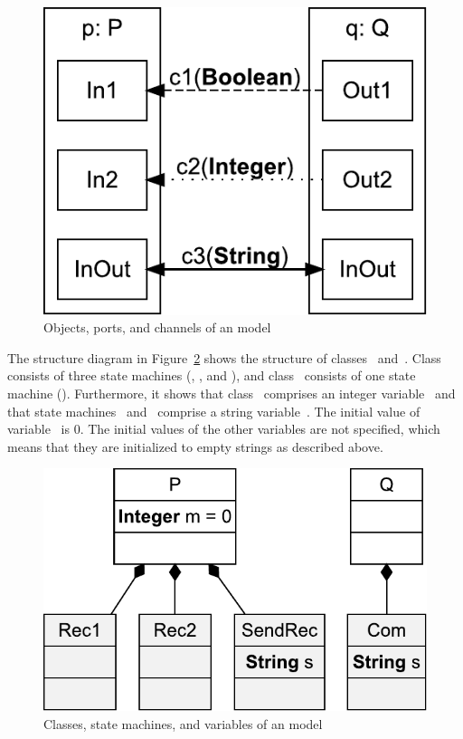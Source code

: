 \begin{figure}[hbt]
 \centering
 \includegraphics[scale=0.45]{slco/figs/CoreWithTime/Communication_CoreWithTime}
 \caption{Objects, ports, and channels of an \SLCO model}
 \label{fig:slco:SLCOExampleCommunication}
\end{figure}

The structure diagram in Figure~\ref{fig:slco:SLCOExampleStructure} shows the structure of classes~ and~.
Class~ consists of three state machines (, , and ), and class~ consists of one state machine ().
Furthermore, it shows that class~ comprises an integer variable~ and that state machines~ and~ comprise a string variable~.
The initial value of variable~ is $0$.
The initial values of the other variables are not specified, which means that they are initialized to empty strings as described above.

\begin{figure}[hbt]
  \centering
  \includegraphics[scale=0.45]{slco/figs/CoreWithTime/Structure_CoreWithTime}
  \caption{Classes, state machines, and variables of an \SLCO model}
  \label{fig:slco:SLCOExampleStructure}
\end{figure}

